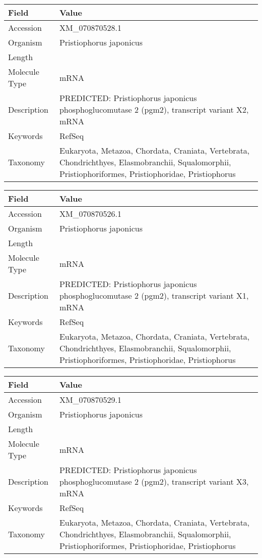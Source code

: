 \documentclass[10pt]{article}
\begin{document}
\vspace{1em}
{\footnotesize
\begin{longtable}{>{\raggedright\arraybackslash}p{4.5cm} >{\raggedright\arraybackslash}p{11.5cm}}
\textbf{Field} & \textbf{Value} \\
\hline
Accession & XM\_070870528.1 \\
Organism & Pristiophorus japonicus \\
Length & 4263 \\
Molecule Type & mRNA \\
Description & PREDICTED: Pristiophorus japonicus phosphoglucomutase 2 (pgm2), transcript variant X2, mRNA \\
Keywords & RefSeq \\
Taxonomy & Eukaryota, Metazoa, Chordata, Craniata, Vertebrata, Chondrichthyes, Elasmobranchii, Squalomorphii, Pristiophoriformes, Pristiophoridae, Pristiophorus \\
\end{longtable}
}

\vspace{1em}
{\footnotesize
\begin{longtable}{>{\raggedright\arraybackslash}p{4.5cm} >{\raggedright\arraybackslash}p{11.5cm}}
\textbf{Field} & \textbf{Value} \\
\hline
Accession & XM\_070870526.1 \\
Organism & Pristiophorus japonicus \\
Length & 4942 \\
Molecule Type & mRNA \\
Description & PREDICTED: Pristiophorus japonicus phosphoglucomutase 2 (pgm2), transcript variant X1, mRNA \\
Keywords & RefSeq \\
Taxonomy & Eukaryota, Metazoa, Chordata, Craniata, Vertebrata, Chondrichthyes, Elasmobranchii, Squalomorphii, Pristiophoriformes, Pristiophoridae, Pristiophorus \\
\end{longtable}
}

\vspace{1em}
{\footnotesize
\begin{longtable}{>{\raggedright\arraybackslash}p{4.5cm} >{\raggedright\arraybackslash}p{11.5cm}}
\textbf{Field} & \textbf{Value} \\
\hline
Accession & XM\_070870529.1 \\
Organism & Pristiophorus japonicus \\
Length & 1611 \\
Molecule Type & mRNA \\
Description & PREDICTED: Pristiophorus japonicus phosphoglucomutase 2 (pgm2), transcript variant X3, mRNA \\
Keywords & RefSeq \\
Taxonomy & Eukaryota, Metazoa, Chordata, Craniata, Vertebrata, Chondrichthyes, Elasmobranchii, Squalomorphii, Pristiophoriformes, Pristiophoridae, Pristiophorus \\
\end{longtable}
}
\end{document}
